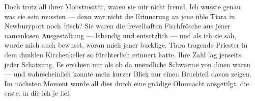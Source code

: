 Doch trotz all ihrer Monstrosität, waren sie mir nicht fremd. Ich wusste genau was sie sein mussten --- denn war nicht die Erinnerung an jene üble Tiara in Newburyport noch frisch? Sie waren die frevelhaften Fischfrösche aus jener namenlosen Ausgestaltung --- lebendig und entsetzlich --- und als ich sie sah, wurde mich auch bewusst, woran mich jener bucklige, Tiara tragende Priester in dem dunklen Kirchenkeller so fürchterlich erinnert hatte. Ihre Zahl lag jenseits jeder Schätzung. Es erschien mir als ob da unendliche Schwärme von ihnen waren --- und wahrscheinlich konnte mein kurzer Blick nur einen Bruchteil davon zeigen. Im nächsten Moment wurde all dies durch eine gnädige Ohnmacht ausgetilgt, die erste, in die ich je fiel.
